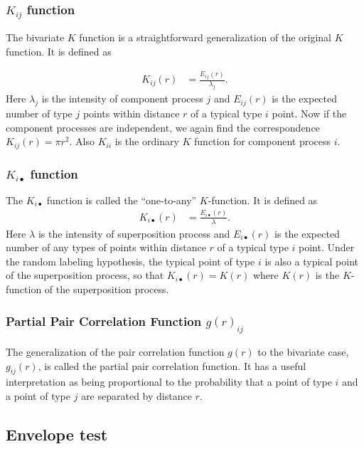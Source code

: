 \documentclass[12pt,a4paper,oneside,article]{memoir}
\begin{document}
\subsubsection{$K_{ij}$ function}

The bivariate $K$ function is a straightforward generalization of the original $K$
function. It is defined as 

\begin{align}
	K_{ij}(r)&=\frac{E_{ij}(r)}{\lambda_j}.
	\label{eq:Kij}
\end{align}
Here $\lambda_j$ is the intensity of component process $j$ and $E_{ij}(r)$ is the expected
number of type $j$ points within distance $r$ of a typical type $i$ point. Now if the
component processes are independent, we again find the correspondence $K_{ij}(r)=\pi r^2$.
Also $K_{ii}$ is the ordinary $K$ function for component process $i$.


\subsubsection{$K_{i\bullet}$ function}

The $K_{i\bullet}$ function is called the ``one-to-any'' $K$-function. It is defined as
\begin{align}
	K_{i\bullet}(r)&=\frac{E_{i\bullet}(r)}{\lambda}.
	\label{eq:Kij}
\end{align}
Here $\lambda$ is the intensity of superposition process and $E_{i\bullet}(r)$ is the expected
number of any types of points within distance $r$ of a typical type $i$ point. Under the random
labeling hypothesis, the typical point of type $i$ is also a typical point of the superposition
process, so that $K_{i\bullet}(r)=K(r)$ where $K(r)$ is the $K$-function of the superposition process.

\subsubsection{Partial Pair Correlation Function $g(r)_{ij}$}

The generalization of the pair correlation function $g(r)$ to the bivariate
case, $g_{ij}(r)$, is called the partial pair correlation function. It has a useful
interpretation as being proportional to the probability that a point of type $i$
and a point of type $j$ are separated by distance $r$.


\subsection{Envelope test}
\end{document}
